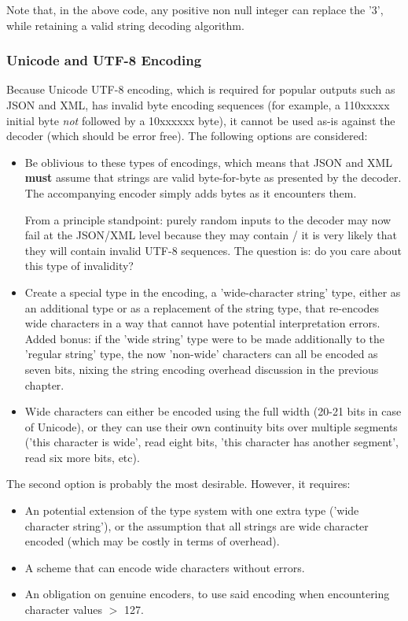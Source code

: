 Note that, in the above code, any positive non null integer can replace
the '3', while retaining a valid string decoding algorithm.

\subsubsection{Unicode and UTF-8 Encoding}

Because Unicode \cite{bib:unicode} UTF-8 \cite{bib:utf8} encoding,
which is required for popular outputs such as
JSON and XML, has invalid byte encoding sequences
(for example, a 110xxxxx initial byte \textit{not} followed by a
10xxxxxx byte), it cannot be used as-is against the decoder (which
should be error free). The following options are considered:

\begin{itemize}
\item Be oblivious to these types of encodings, which means that JSON and XML
      \textbf{must} assume that strings are valid byte-for-byte
      as presented by the decoder. The accompanying encoder simply
      adds bytes as it encounters them.

      From a principle standpoint: purely random inputs to the
      decoder may now fail at the JSON/XML level because they may
      contain / it is very likely that they will contain invalid
      UTF-8 sequences. The question is: do you care about this type
      of invalidity?
\item Create a special type in the encoding, a 'wide-character string' type,
      either as an additional type or as a replacement of the string type,
      that re-encodes wide characters in a way that cannot have
      potential interpretation errors. Added bonus: if the 'wide string' type
      were to be made additionally to the 'regular string' type, the now
      'non-wide' characters can all be encoded as seven bits, nixing the
      string encoding overhead discussion in the previous chapter.
\item Wide characters can either be encoded using the full width (20-21 bits
      in case of Unicode), or they can use their own continuity bits over
      multiple segments ('this character is wide', read eight bits,
      'this character has another segment', read six more bits, etc).
\end{itemize}

The second option is probably the most desirable. However, it requires:

\begin{itemize}
\item An potential extension of the type system with one extra type
      ('wide character string'), or the assumption that all strings are
      wide character encoded (which may be costly in terms of overhead).
\item A scheme that can encode wide characters without errors.
\item An obligation on genuine encoders, to use said encoding when
      encountering character values $>$ 127.
\end{itemize}

